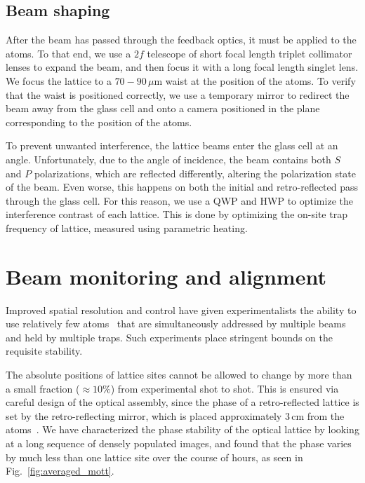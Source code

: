 \documentclass[twocolumn,aps,pra,showpacs,preprintnumbers,bibnotes]{revtex4-1}
\begin{document}
\subsection{Beam shaping}
After the beam has passed through the feedback optics, it must be applied to the atoms. To that end, we use a $2f$ telescope of short focal length triplet collimator lenses to expand the beam, and then focus it with a long focal length singlet lens.
We focus the lattice to a $70-90$\,$\mu$m waist at the position of the atoms.
To verify that the waist is positioned correctly, we use a temporary mirror to redirect the beam away from the glass cell and onto a camera positioned in the plane corresponding to the position of the atoms.

To prevent unwanted interference, the lattice beams enter the glass cell at an angle.
Unfortunately, due to the angle of incidence, the beam contains both $S$ and $P$ polarizations, which are reflected differently, altering the polarization state of the beam.
Even worse, this happens on both the initial and retro-reflected pass through the glass cell.
For this reason, we use a QWP and HWP to optimize the interference contrast of each lattice.
This is done by optimizing the on-site trap frequency of lattice, measured using parametric heating.

\section{Beam monitoring and alignment}
Improved spatial resolution and control have given experimentalists the ability to use relatively few atoms~\cite{Preiss2015, Choi2016, Mazurenko2016} that are simultaneously addressed by multiple beams and held by multiple traps.
Such experiments place stringent bounds on the requisite stability.

The absolute positions of lattice sites cannot be allowed to change by more than a small fraction ($\approx 10\%$) from experimental shot to shot.
This is ensured via careful design of the optical assembly, since the phase of a retro-reflected lattice is set by the retro-reflecting mirror, which is placed approximately $3\,$cm from the atoms~\cite{Huber2014}.
We have characterized the phase stability of the optical lattice by looking at a long sequence of densely populated images, and found that the phase varies by much less than one lattice site over the course of hours, as seen in Fig.~\ref{fig:averaged_mott}.
\end{document}
